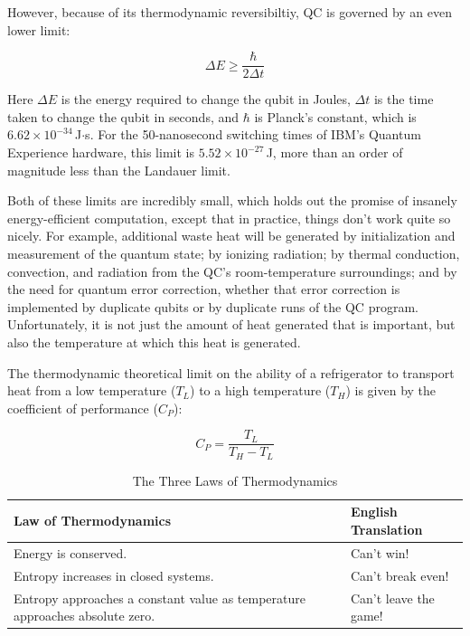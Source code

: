 However, because of its thermodynamic reversibiltiy,
QC is governed by an even lower limit:

\begin{equation}
	\Delta E \geq \frac{\hbar}{2 \Delta t}
\end{equation}

Here $\Delta E$ is the energy required to change the qubit in Joules,
$\Delta t$ is the time taken to change the qubit in seconds, and
$\hbar$ is Planck's constant, which is $6.62 \times 10^{-34}$\,J$\cdot$s.
For the 50-nanosecond switching times of IBM's Quantum Experience
hardware, this limit is $5.52 \times 10^{-27}$\,J, more than an order
of magnitude less than the Landauer limit.

Both of these limits are incredibly small, which holds out the promise
of insanely energy-efficient computation, except that
in practice, things don't work quite so nicely.
For example, additional waste heat will be generated
by initialization and measurement of the quantum state;
by ionizing radiation;
by thermal conduction, convection, and radiation from
the QC's room-temperature surroundings;
and
by the need for quantum error correction, whether that error correction
is implemented by duplicate qubits or by duplicate runs of the QC
program.
Unfortunately, it is not just the amount of heat generated that is
important, but also the temperature at which this heat is generated.

The thermodynamic theoretical limit on the ability of a refrigerator
to transport heat from a low temperature ($T_L$) to a high temperature
($T_H$) is given by the coefficient of performance ($C_P$):

\begin{equation}
	C_P = \frac{T_L}{T_H - T_L}
\end{equation}

\begin{table}
\centering\footnotesize
\begin{tabular}{p{1.7in}|p{0.95in}}
Law of Thermodynamics
	& English Translation \\
\hline
\hline
Energy is conserved.
	& Can't win! \\
\hline
Entropy increases in closed systems.
	& Can't break even! \\
\hline
Entropy approaches a constant value as temperature approaches absolute zero.
	& Can't leave the game! \\
\end{tabular}
\caption{The Three Laws of Thermodynamics}
\label{tab:future:The Three Laws of Thermodynamics}
\end{table}

